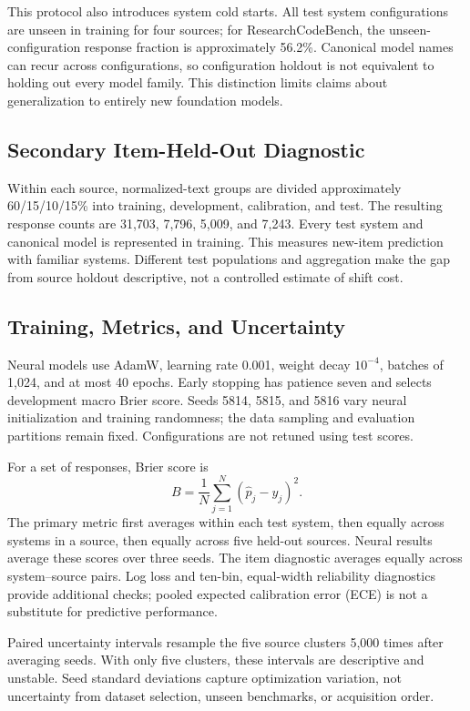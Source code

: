 \documentclass[conference]{IEEEtran}
\begin{document}
This protocol also introduces system cold starts. All test system configurations are unseen in training for four sources; for ResearchCodeBench, the unseen-configuration response fraction is approximately 56.2\%. Canonical model names can recur across configurations, so configuration holdout is not equivalent to holding out every model family. This distinction limits claims about generalization to entirely new foundation models.

\subsection{Secondary Item-Held-Out Diagnostic}
Within each source, normalized-text groups are divided approximately 60/15/10/15\% into training, development, calibration, and test. The resulting response counts are 31,703, 7,796, 5,009, and 7,243. Every test system and canonical model is represented in training. This measures new-item prediction with familiar systems. Different test populations and aggregation make the gap from source holdout descriptive, not a controlled estimate of shift cost.

\subsection{Training, Metrics, and Uncertainty}
Neural models use AdamW, learning rate 0.001, weight decay $10^{-4}$, batches of 1,024, and at most 40 epochs. Early stopping has patience seven and selects development macro Brier score. Seeds 5814, 5815, and 5816 vary neural initialization and training randomness; the data sampling and evaluation partitions remain fixed. Configurations are not retuned using test scores.

For a set of responses, Brier score is
\begin{equation}
B=\frac{1}{N}\sum_{j=1}^{N}(\hat p_j-y_j)^2.
\end{equation}
The primary metric first averages within each test system, then equally across systems in a source, then equally across five held-out sources. Neural results average these scores over three seeds. The item diagnostic averages equally across system--source pairs. Log loss and ten-bin, equal-width reliability diagnostics provide additional checks; pooled expected calibration error (ECE) is not a substitute for predictive performance.

Paired uncertainty intervals resample the five source clusters 5,000 times after averaging seeds. With only five clusters, these intervals are descriptive and unstable. Seed standard deviations capture optimization variation, not uncertainty from dataset selection, unseen benchmarks, or acquisition order.
\end{document}
